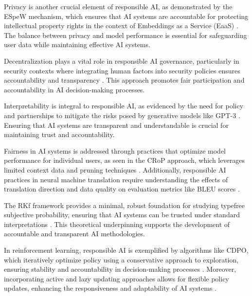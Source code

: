 Privacy is another crucial element of responsible AI, as demonstrated by the ESpeW mechanism, which ensures that AI systems are accountable for protecting intellectual property rights in the context of Embeddings as a Service (EaaS) \cite{wang2024espewrobustcopyrightprotection}. The balance between privacy and model performance is essential for safeguarding user data while maintaining effective AI systems.



Decentralization plays a vital role in responsible AI governance, particularly in security contexts where integrating human factors into security policies ensures accountability and transparency \cite{kammller2020applyingisabelleinsiderframework}. This approach promotes fair participation and accountability in AI decision-making processes.



Interpretability is integral to responsible AI, as evidenced by the need for policy and partnerships to mitigate the risks posed by generative models like GPT-3 \cite{mcguffie2020radicalizationrisksgpt3advanced}. Ensuring that AI systems are transparent and understandable is crucial for maintaining trust and accountability.



Fairness in AI systems is addressed through practices that optimize model performance for individual users, as seen in the CRoP approach, which leverages limited context data and pruning techniques \cite{kaur2024cropcontextwiserobuststatic}. Additionally, responsible AI practices in neural machine translation require understanding the effects of translation direction and data quality on evaluation metrics like BLEU scores \cite{bogoychev2020domaintranslationesenoisesynthetic}.



The RKf framework provides a minimal, robust foundation for studying typefree subjective probability, ensuring that AI systems can be trusted under standard interpretations \cite{cieslinski2022axiomstypefreesubjectiveprobability}. This theoretical underpinning supports the development of accountable and transparent AI methodologies.



In reinforcement learning, responsible AI is exemplified by algorithms like CDPO, which iteratively optimize policy using a conservative approach to exploration, ensuring stability and accountability in decision-making processes \cite{zhang2022conservativedualpolicyoptimization}. Moreover, incorporating active and lazy updating approaches allows for flexible policy updates, enhancing the responsiveness and adaptability of AI systems \cite{howson2023optimismdelaysepisodicreinforcement}.



